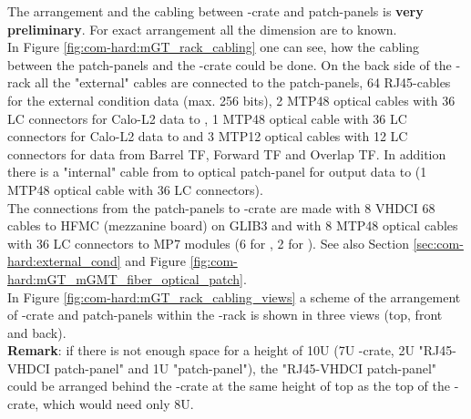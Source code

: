 The arrangement and the cabling between \ugt-crate and patch-panels is \textbf{very preliminary}. For exact arrangement all the dimension are to known.\\
In Figure \ref{fig:com-hard:mGT_rack_cabling} one can see, how the cabling between the patch-panels and the \ugt-crate could be done. On the back side of the \ugt-rack
all the "external" cables are connected to the patch-panels, 64 RJ45-cables for the external condition data (max. 256 bits), 2 MTP48 optical cables with 36 LC connectors
for Calo-L2 data to \ugt, 1 MTP48 optical cable with 36 LC connectors for Calo-L2 data to \ugmt and 3 MTP12 optical cables with 12 LC connectors for data from Barrel TF,
Forward TF and Overlap TF. In addition there is a "internal" cable from \ugmt to optical patch-panel for \ugmt output data to \ugt (1 MTP48 optical cable with 36 LC connectors).\\
The connections from the patch-panels to \ugt-crate are made with 8 VHDCI 68 cables to HFMC (mezzanine board) on GLIB3 and with 8 MTP48 optical cables with 36 LC connectors
to MP7 modules (6 for \ugt, 2 for \ugmt). See also Section \ref{sec:com-hard:external_cond} and Figure \ref{fig:com-hard:mGT_mGMT_fiber_optical_patch}.\\
In Figure \ref{fig:com-hard:mGT_rack_cabling_views} a scheme of the arrangement of \ugt-crate and patch-panels within the \ugt-rack is shown in three views (top, front and back).\\
\textbf{Remark}: if there is not enough space for a height of 10U (7U \ugt-crate, 2U "RJ45-VHDCI patch-panel" and 1U "\finor patch-panel"),
the "RJ45-VHDCI patch-panel" could be arranged behind the \ugt-crate at the same height of top as the top of the \ugt-crate, which would need only 8U.

